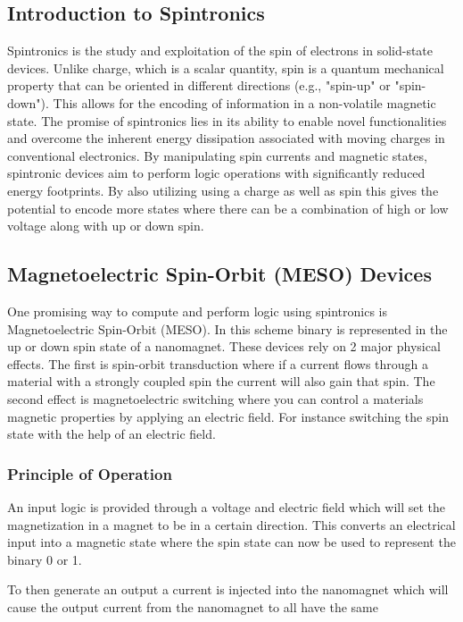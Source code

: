 \documentclass[sigconf,authordraft]{acmart}
\begin{document}
\subsection{Introduction to Spintronics}
Spintronics is the study and exploitation of the spin 
of electrons in solid-state devices. Unlike charge, which is a 
scalar quantity, spin is a quantum mechanical property that can 
be oriented in different directions (e.g., "spin-up" or "spin-down").
This allows for the encoding of information in a non-volatile magnetic
state. The promise of spintronics lies in its ability to enable 
novel functionalities and overcome the inherent energy dissipation 
associated with moving charges in conventional electronics. By manipulating 
spin currents and magnetic states, spintronic devices aim to perform logic 
operations with significantly reduced energy footprints. 
By also utilizing using a charge as well as spin this gives the potential to encode more 
states where there can be a combination of high or low voltage along 
with up or down spin. 


\subsection{Magnetoelectric Spin-Orbit (MESO) Devices} 
One promising way to compute and perform logic using spintronics is 
Magnetoelectric Spin-Orbit (MESO). In this scheme binary is represented 
in the up or down spin state of a nanomagnet. These devices rely 
on 2 major physical effects. The first is spin-orbit transduction where 
if a current flows through a material with a strongly coupled spin 
the current will also gain that spin. The second effect is magnetoelectric 
switching where you can control a materials magnetic properties by applying 
an electric field. For instance switching the spin state with the help of 
an electric field.

\subsubsection{Principle of Operation}
An input logic is provided through a voltage and electric field which 
will set the magnetization in a magnet to be in a certain direction. This 
converts an electrical input into a magnetic state where the spin state 
can now be used to represent the binary 0 or 1. 

To then generate an output a current is injected into the nanomagnet 
which will cause the output current from the nanomagnet to all have 
the same 
\end{document}
